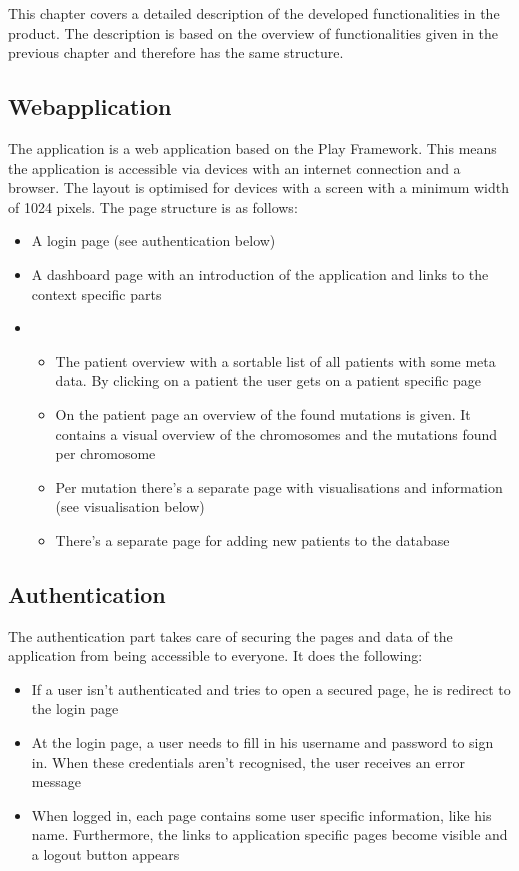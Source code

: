 This chapter covers a detailed description of the developed functionalities in the product. The description is based  on the overview of functionalities given in the previous chapter and therefore has the same structure.

\subsection{Webapplication}

The application is a web application based on the Play Framework. This means the application is accessible via devices with an internet connection and a browser. The layout is optimised for devices with a screen with a minimum width of 1024 pixels. The page structure is as follows:

\begin{itemize}
  \item A login page (see authentication below)
  \item A dashboard page with an introduction of the application and links to the context specific parts
  \item
  \begin{itemize}
     \item The patient overview with a sortable list of all patients with some meta data. By clicking on a patient the user gets on a patient specific page
     \item On the patient page an overview of the found mutations is given. It contains a visual overview of the chromosomes and the mutations found per chromosome
     \item Per mutation there's a separate page with visualisations and information (see visualisation below)
     \item There's a separate page for adding new patients to the database
  \end{itemize}
\end{itemize}

\subsection{Authentication}

The authentication part takes care of securing the pages and data of the application from being accessible to everyone. It does the following:

\begin{itemize}
  \item If a user isn't authenticated and tries to open a secured page, he is redirect to the login page
  \item At the login page, a user needs to fill in his username and password to sign in. When these credentials aren't recognised, the user receives an error message
  \item When logged in, each page contains some user specific information, like his name. Furthermore, the links to application specific pages become visible and a logout button appears
\end{itemize}

